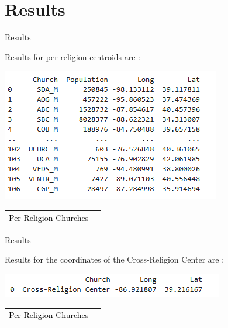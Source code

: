\documentclass[12pt]{beamer}
\begin{document}
\section{Results}
\begin{frame}{Results}


Results for per religion centroids are :
\begin{center}
    \includegraphics[width=0.8\linewidth, height=0.6\textheight, keepaspectratio]{Centroids.png}
    
    \vspace{1em}
    \begin{tabular}{ll}
      \textcolor{black}{Per Religion Churches
 }\\

    \end{tabular}
\end{center}
\end{frame}

\begin{frame}{Results}


Results for the coordinates of the Cross-Religion Center are  :
\begin{center}
    \includegraphics[width=0.8\linewidth, height=0.6\textheight, keepaspectratio]{Final_Centroid.png}
    
    \vspace{1em}
    \begin{tabular}{ll}
      \textcolor{black}{Per Religion Churches
 }\\

    \end{tabular}
\end{center}
\end{frame}
\end{document}
